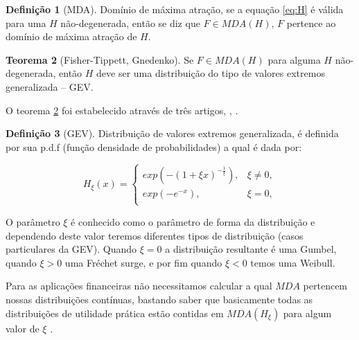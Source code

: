 \documentclass[review]{elsarticle}
\theoremstyle{definition}
\newtheorem{teor}{Teorema}%
\newtheorem{defi}[teor]{Definição}
\begin{document}
%

\begin{defi}[MDA] \label{defi:MDA}
	Domínio de máxima atração, se a equação \eqref{eq:H} é válida para uma $H$ não-degenerada, então se diz que $F \in MDA(H)$, $F$ pertence ao domínio de máxima atração de $H$.
\end{defi}

\begin{teor}[Fisher-Tippett, Gnedenko] \label{teor:fisher-tippett}
	Se $F \in MDA(H)$ para alguma $H$ não-degenerada, então $H$ deve ser uma distribuição do tipo de valores extremos generalizada – GEV.
\end{teor}
O teorema \ref{teor:fisher-tippett} foi estabelecido através de três artigos, \cite{Fisher1928}, \cite{Gnedenko1941, Gnedenko1943}.

\begin{defi}[GEV] \label{defi:GEV}
	Distribuição de valores extremos generalizada, é definida por sua p.d.f (função densidade de probabilidades) a qual é dada por:
\end{defi}

\begin{equation}
\label{eq:GEV}
H_\xi(x) = 
\begin{cases}
exp(-(1+\xi x)^{-\frac{1}{\xi}}), & \xi \neq 0,\\
exp(-e^{-x}), & \xi = 0,\\
\end{cases}
\end{equation}

O parâmetro $\xi$ é conhecido como o parâmetro de forma da distribuição e dependendo deste valor teremos diferentes tipos de distribuição (casos particulares da GEV). Quando $\xi=0$ a distribuição resultante é uma Gumbel, quando  $\xi>0$ uma Fréchet surge, e por fim quando $\xi<0$ temos uma Weibull.

Para as aplicações financeiras não necessitamos calcular a qual $MDA$ pertencem nossas distribuições contínuas, bastando saber que basicamente todas as distribuições de utilidade prática estão contidas em $MDA(H_\xi)$ para algum valor de $\xi$ \cite[p. ~139]{McNeil2015}.
\end{document}
